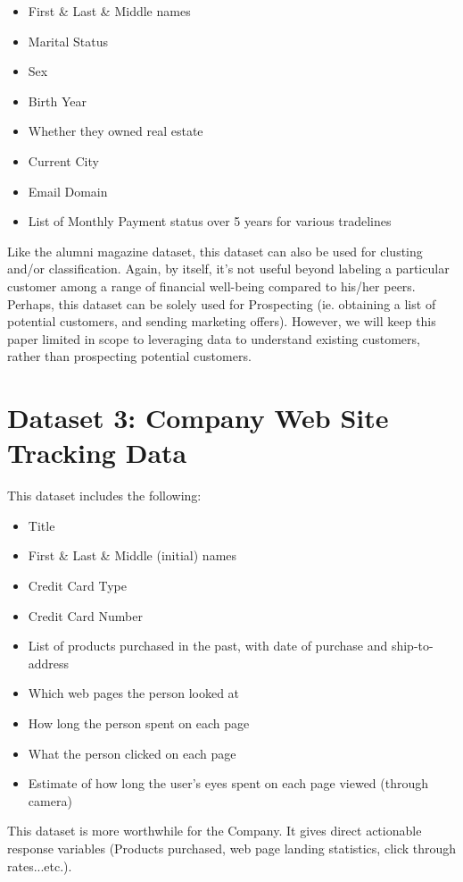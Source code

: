 \documentclass[letterpaper,12pt]{article}
\begin{document}
\begin{itemize}
\item First \& Last \& Middle names
\item Marital Status
\item Sex
\item Birth Year
\item Whether they owned real estate
\item Current City
\item Email Domain
\item List of Monthly Payment status over 5 years for various tradelines
\end{itemize}

Like the alumni magazine dataset, this dataset can also be used for clusting and/or classification.  Again, by itself, it's not useful beyond labeling a particular customer among a range of financial well-being compared to his/her peers.  Perhaps, this dataset can be solely used for Prospecting (ie. obtaining a list of potential customers, and sending marketing offers).  However, we will keep this paper limited in scope to leveraging data to understand existing customers, rather than prospecting potential customers.  

\section{Dataset 3: Company Web Site Tracking Data}
This dataset includes the following:

\begin{itemize}
\item Title
\item First \& Last \& Middle (initial) names
\item Credit Card Type
\item Credit Card Number
\item List of products purchased in the past, with date of purchase and ship-to-address
\item Which web pages the person looked at
\item How long the person spent on each page
\item What the person clicked on each page
\item Estimate of how long the user's eyes spent on each page viewed (through camera)
\end{itemize}

This dataset is more worthwhile for the Company.  It gives direct actionable response variables (Products purchased, web page landing statistics, click through rates...etc.).
\end{document}
